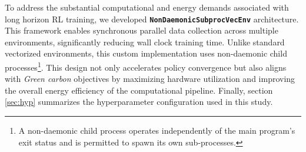 \justify To address the substantial computational and energy demands associated with long horizon RL training, we developed \textbf{\texttt{NonDaemonicSubprocVecEnv}} architecture. This framework enables synchronous parallel data collection across multiple environments, significantly reducing wall clock training time. Unlike standard vectorized environments, this custom implementation uses non-daemonic child processes\footnote{A non-daemonic child process operates independently of the main program's exit status and is permitted to spawn its own sub-processes.}. This design not only accelerates policy convergence but also aligns with \emph{Green carbon} objectives by maximizing hardware utilization and improving the overall energy efficiency of the computational pipeline. 
Finally, section \ref{sec:hyp} summarizes the hyperparameter configuration used in this study.

